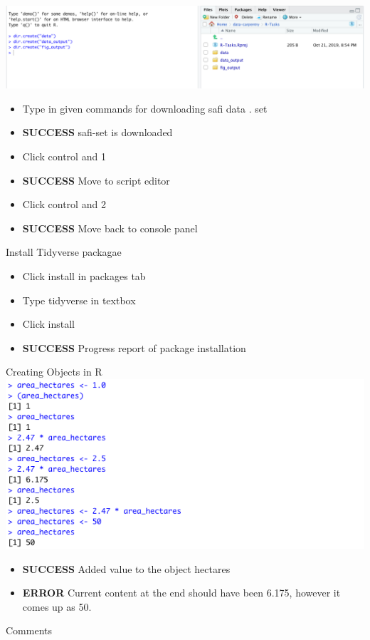 \documentclass{article}
\begin{document}
\includegraphics[width=\textwidth]{Images/RStudio_1.png} 

\begin{itemize}
\item Type in given commands for downloading safi data . set
\item \textbf{SUCCESS} safi-set is downloaded
\item Click control and 1 
\item \textbf{SUCCESS} Move to script editor
\item Click control and 2
\item \textbf{SUCCESS} Move back to console panel
\end{itemize}
Install Tidyverse packagae
\begin{itemize}
\item Click install in packages tab
\item Type tidyverse in textbox
\item Click install
\item \textbf{SUCCESS} Progress report of package installation
\end{itemize}
Creating Objects in R \\ 
\includegraphics[width=\textwidth]{Images/RStudio_3.png}
\begin{itemize}
\item \textbf{SUCCESS} Added value to the object hectares
\item \textbf{ERROR} Current content at the end should have been 6.175, however it comes up as 50. 
\end{itemize}
Comments \\
\end{document}
